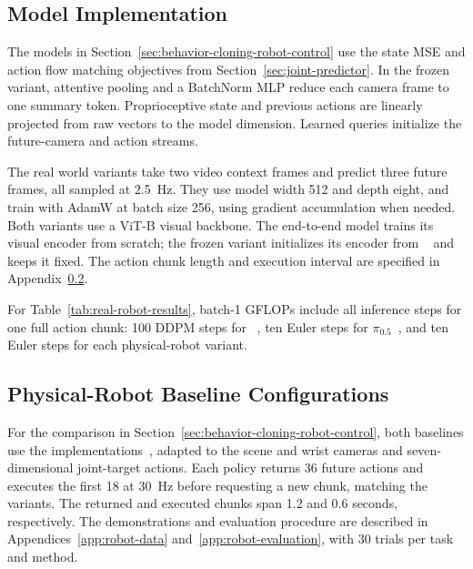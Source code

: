 \subsection{Model Implementation}
\label{app:robot-implementation}

The \method{} models in Section~\ref{sec:behavior-cloning-robot-control} use the state MSE and action flow
matching objectives from Section~\ref{sec:joint-predictor}. In the frozen
 variant, attentive pooling and a BatchNorm MLP reduce each
camera frame to one summary token. Proprioceptive state and previous actions are
linearly projected from raw vectors to the model dimension. Learned queries initialize
the future-camera and action streams.

The real world \method{} variants take two video context frames and predict three future frames,
all sampled at 2.5~Hz.
They use model width 512 and depth eight, and train with AdamW
at batch size 256, using gradient accumulation when needed. Both variants use a
ViT-B visual backbone. The end-to-end model trains its visual encoder from scratch;
the frozen variant initializes its encoder from ~\citep{murlabadia2026vjepa21}
and keeps it fixed. The action chunk length and execution interval are specified
in Appendix~\ref{app:bc-physical}.

For Table~\ref{tab:real-robot-results}, batch-1 GFLOPs include all inference steps
for one full action chunk: 100 DDPM steps for ~\citep{chi2023diffusionpolicy},
ten Euler steps for $\pi_{0.5}$~\citep{physicalintelligence2025pi05}, and ten
Euler steps for each physical-robot \method{} variant.

\subsection{Physical-Robot Baseline Configurations}
\label{app:bc-physical}
For the comparison in Section~\ref{sec:behavior-cloning-robot-control}, both baselines use the
 implementations~\citep{cadene2026lerobot}, adapted to the
scene and wrist cameras and seven-dimensional joint-target actions. Each policy
returns 36 future actions and executes the first 18 at 30~Hz before requesting
a new chunk, matching the \method{} variants. The returned and executed chunks
span 1.2 and 0.6 seconds, respectively. The demonstrations and evaluation procedure
are described in Appendices~\ref{app:robot-data} and~\ref{app:robot-evaluation}, with 30 trials per task and method.

